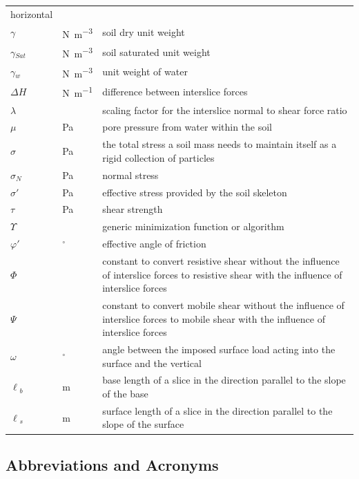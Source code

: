 \documentclass[12pt]{article}
\renewcommand{\arraystretch}{1}
\begin{document}
\begin{longtable*}{  l  l  p{8.5cm}  }
horizontal
\\
$\gamma{}$ & \si{\newton\per\cubic\meter} & soil dry unit weight
\\
${\gamma{}_{Sat}}$ &  \si{\newton\per\cubic\meter} & soil saturated unit weight
\\
${\gamma{}_{w}}$ & \si{\newton\per\cubic\meter} & unit weight of water
\\
$\Delta{}H$ & \si{\newton\per\meter} & difference between interslice forces
\\
$\lambda{}$ & & scaling factor for the interslice normal to shear force ratio
\\
$\mu{}$ &\si{\pascal} & pore pressure from water within the soil
\\
$\sigma{}$ & \si{\pascal} & the total stress a soil mass needs
to maintain itself as a rigid collection of particles
\\
$\sigma{}_N$ & \si{\pascal} & normal stress
\\
$\sigma{}'$ & \si{\pascal} & effective stress provided by the soil skeleton
\\
$\tau{}$ & \si{\pascal} & shear strength
\\
$\Upsilon{}$ & & generic minimization function or algorithm 
\\
$\varphi{}'$ & ${}^{\circ}$ & effective angle of friction
\\
$\Phi{}$ & & constant to convert resistive shear without the 
influence of interslice forces to resistive shear with the influence of 
interslice 
forces
\\
$\Psi{}$ & & constant to convert mobile shear without the 
influence of interslice forces to mobile shear with the influence of interslice 
forces
\\
$\omega{}$ & ${}^{\circ}$ & angle between the imposed surface load acting into 
the surface and the vertical
\\
${\ell{}_{b}}$ &  \si{\meter}& base length of a slice in the 
direction parallel to the slope of the base
\\
${\ell{}_{s}}$ &  \si{\meter}& surface length of a slice in the direction 
parallel to the slope of the surface \\

\hline
\end{longtable*}
\renewcommand{\arraystretch}{1}


\subsection{Abbreviations and Acronyms}
\end{document}

